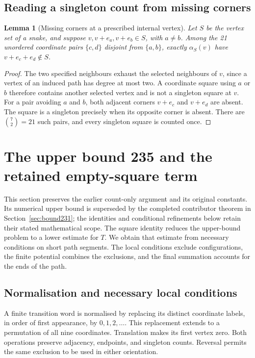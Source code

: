 \documentclass[11pt,a4paper]{article}
\newtheorem{lemma}[theorem]{Lemma}
\theoremstyle{definition}
\theoremstyle{remark}
\begin{document}
\subsection{Reading a singleton count from missing corners}
\begin{lemma}[Missing corners at a prescribed internal vertex]\label{lem:window-missing-corners}
Let $S$ be the vertex set of a snake, and suppose $v,v+e_a,v+e_b\in S$, with $a\ne b$. Among the 21 unordered coordinate pairs $\{c,d\}$ disjoint from $\{a,b\}$, exactly $\alpha_S(v)$ have $v+e_c+e_d\notin S$.
\end{lemma}
\begin{proof}
The two specified neighbours exhaust the selected neighbours of $v$, since a vertex of an induced path has degree at most two. A coordinate square using $a$ or $b$ therefore contains another selected vertex and is not a singleton square at $v$. For a pair avoiding $a$ and $b$, both adjacent corners $v+e_c$ and $v+e_d$ are absent. The square is a singleton precisely when its opposite corner is absent. There are $\binom{7}{2}=21$ such pairs, and every singleton square is counted once.
\end{proof}

\section{The upper bound 235 and the retained empty-square term}\label{sec:upper-proof}
This section preserves the earlier count-only argument and its original
constants. Its numerical upper bound is superseded by the completed
contributor theorem in Section~\ref{sec:bound231}; the identities and
conditional refinements below retain their stated mathematical scope.
The square identity reduces the upper-bound problem to a lower estimate for $T$. We obtain that estimate from necessary conditions on short path segments. The local conditions exclude configurations, the finite potential combines the exclusions, and the final summation accounts for the ends of the path.
\subsection{Normalisation and necessary local conditions}
A finite transition word is normalised by replacing its distinct coordinate labels, in order of first appearance, by $0,1,2,\ldots$. This replacement extends to a permutation of all nine coordinates. Translation makes its first vertex zero. Both operations preserve adjacency, endpoints, and singleton counts. Reversal permits the same exclusion to be used in either orientation.
\end{document}

